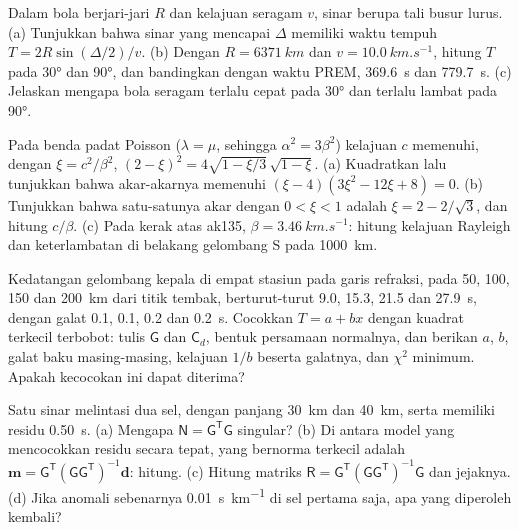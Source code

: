 \begin{exercise}[$\star\star$]\label{exo:b3:seismology-imaging:5}
Dalam bola berjari-jari $R$ dan kelajuan seragam $v$, sinar berupa tali busur lurus.
(a) Tunjukkan bahwa sinar yang mencapai $\Delta$ memiliki waktu tempuh
$T = 2R\sin(\Delta/2)/v$. (b) Dengan $R = \qty{6371}{km}$ dan
$v = \qty{10.0}{km.s^{-1}}$, hitung $T$ pada \ang{30} dan \ang{90}, dan bandingkan
dengan waktu PREM, \qty{369.6}{s} dan \qty{779.7}{s}. (c) Jelaskan mengapa
bola seragam terlalu cepat pada \ang{30} dan terlalu lambat pada \ang{90}.
\end{exercise}

\begin{exercise}[$\star\star$]\label{exo:b3:seismology-imaging:6}
Pada benda padat Poisson ($\lambda = \mu$, sehingga $\alpha^2 = 3\beta^2$) kelajuan 
$c$ memenuhi, dengan $\xi = c^2/\beta^2$,
$(2 - \xi)^2 = 4\sqrt{1 - \xi/3}\,\sqrt{1 - \xi}$. (a) Kuadratkan lalu tunjukkan
bahwa akar-akarnya memenuhi $(\xi - 4)(3\xi^2 - 12\xi + 8) = 0$. (b) Tunjukkan bahwa
satu-satunya akar dengan $0 < \xi < 1$ adalah $\xi = 2 - 2/\sqrt3$, dan hitung $c/\beta$.
(c) Pada kerak atas ak135, $\beta = \qty{3.46}{km.s^{-1}}$: hitung
kelajuan Rayleigh dan keterlambatan  di belakang gelombang S pada
\qty{1000}{km}.
\end{exercise}

\begin{exercise}[$\star\star$]\label{exo:b3:seismology-imaging:7}
Kedatangan gelombang kepala di empat stasiun pada garis refraksi, pada 50, 100, 150 dan
\qty{200}{km} dari titik tembak, berturut-turut 9.0, 15.3, 21.5 dan \qty{27.9}{s}, dengan
galat 0.1, 0.1, 0.2 dan \qty{0.2}{s}. Cocokkan $T = a + bx$ dengan kuadrat terkecil
terbobot: tulis $\mathsf G$ dan $\mathsf C_d$, bentuk persamaan normalnya, dan
berikan $a$, $b$, galat baku masing-masing, kelajuan $1/b$ beserta galatnya, dan
$\chi^2$ minimum. Apakah kecocokan ini dapat diterima?
\end{exercise}

\begin{exercise}[$\star\star$]\label{exo:b3:seismology-imaging:8}
Satu sinar melintasi dua sel, dengan panjang \qty{30}{km} dan \qty{40}{km}, serta
memiliki residu \qty{0.50}{s}. (a) Mengapa $\mathsf N = \mathsf G^{\mathsf T}
\mathsf G$ singular? (b) Di antara model yang mencocokkan residu secara tepat, yang
bernorma terkecil adalah $\mathbf m = \mathsf G^{\mathsf T}(\mathsf G\mathsf
G^{\mathsf T})^{-1}\mathbf d$: hitung. (c) Hitung matriks
$\mathsf R = \mathsf G^{\mathsf T}(\mathsf G\mathsf G^{\mathsf T})^{-1}\mathsf G$
dan jejaknya. (d) Jika anomali sebenarnya \qty{0.01}{s.km^{-1}} di sel pertama
saja, apa yang diperoleh kembali?
\end{exercise}

